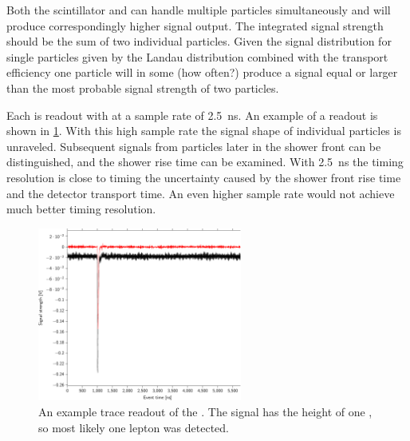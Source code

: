 Both the scintillator and \pmt can handle multiple particles simultaneously and will produce correspondingly higher signal output. The integrated signal strength should be the sum of two individual particles. Given the signal distribution for single particles given by the Landau distribution combined with the transport efficiency one particle will in some (how often?) produce a signal equal or larger than the most probable signal strength of two particles.

Each \pmt is readout with \adcs at a sample rate of \SI{2.5}{\ns}. An example of a readout is shown in \cref{fig:trace}. With this high sample rate the signal shape of individual particles is unraveled. Subsequent signals from particles later in the shower front can be distinguished, and the shower rise time can be examined. With \SI{2.5}{\ns} the timing resolution is close to timing the uncertainty caused by the shower front rise time and the detector transport time. An even higher sample rate would not achieve much better timing resolution.

\begin{figure}
    \centering
    \includegraphics[width=0.6\textwidth]
                    {plots/experiment/trace}
    \caption{An example trace readout of the \pmt. The signal has the height of one \mip, so most likely one lepton was detected.}
    \label{fig:trace}
\end{figure}


